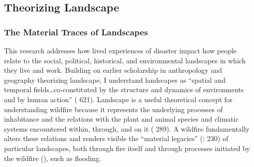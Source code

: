 \documentclass[
]{article}
\begin{document}
\subsection{Theorizing Landscape}\label{theorizing-landscape}

\subsubsection{The Material Traces of Landscapes}\label{the-material-traces-of-landscapes}

This research addresses how lived experiences of disaster impact how people relate to the social, political, historical, and environmental landscapes in which they live and work. Building on earlier scholarship in anthropology and geography theorizing landscape, I understand landscapes as ``spatial and temporal fields\ldots co-constituted by the structure and dynamics of environments and by human action'' ( 621). Landscape is a useful theoretical concept for understanding wildfire because it represents the underlying processes of inhabitance and the relations with the plant and animal species and climatic systems encountered within, through, and on it ( 289). A wildfire fundamentally alters these relations and renders visible the ``material legacies'' (: 230) of particular landscapes, both through fire itself and through processes initiated by the wildfire (), such as flooding.
\end{document}
